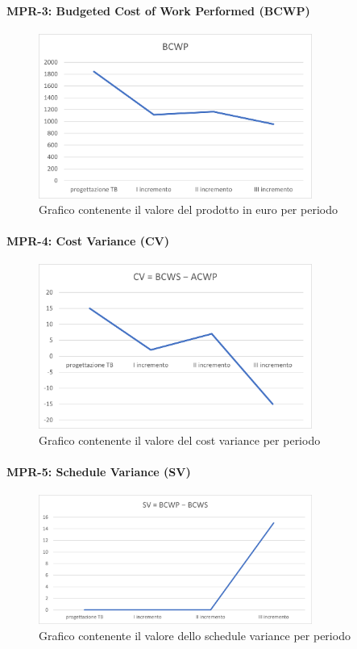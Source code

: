 \paragraph{MPR-3: Budgeted Cost of Work Performed (BCWP)}\label{_BCWP}
\begin{figure}[!htb]
    \centering
    \includegraphics[width=0.8\textwidth]{res/images/metriche_costi/BCWP.png}
    \caption{Grafico contenente il valore del prodotto in euro per periodo}
\end{figure}



\paragraph{MPR-4: Cost Variance (CV)}\label{_CV}
\begin{figure}[!htb]
    \centering
    \includegraphics[width=0.8\textwidth]{res/images/metriche_costi/CV.png}
    \caption{Grafico contenente il valore del cost variance per periodo}
\end{figure}
\newpage
\paragraph{MPR-5: Schedule Variance (SV)}\label{_SV}
\begin{figure}[!htb]
    \centering
    \includegraphics[width=0.8\textwidth]{res/images/metriche_costi/SV.png}
    \caption{Grafico contenente il valore dello schedule variance per periodo}
\end{figure} 


